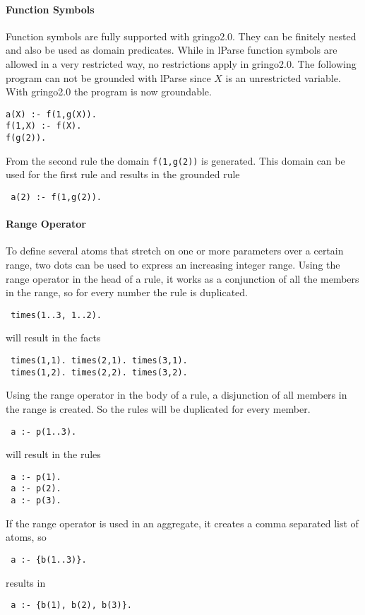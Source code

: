 \documentclass[a4paper,10pt]{article}
\begin{document}
\paragraph{Function Symbols}
Function symbols are fully supported with gringo2.0.
They can be finitely nested and also be used as domain predicates.
While in lParse function symbols are allowed in a very restricted way, no restrictions apply in gringo2.0.
The following program can not be grounded with lParse since $X$ is an unrestricted variable. With gringo2.0 the program is now groundable.
\begin{verbatim}
a(X) :- f(1,g(X)).
f(1,X) :- f(X).
f(g(2)).
\end{verbatim}
From the second rule the domain \texttt{f(1,g(2))} is generated.
This domain can be used for the first rule and results in the grounded rule
\begin{verbatim}
 a(2) :- f(1,g(2)).
\end{verbatim}

\paragraph{Range Operator}
To define several atoms that stretch on one or more parameters over a certain range, two dots can be used to express an increasing integer range.
Using the range operator in the head of a rule, it works as a conjunction of all the members in the range, so for every number the rule is duplicated.
\begin{verbatim}
 times(1..3, 1..2).
\end{verbatim}
will result in the facts
\begin{verbatim}
 times(1,1). times(2,1). times(3,1).
 times(1,2). times(2,2). times(3,2).
\end{verbatim}

Using the range operator in the body of a rule, a disjunction of all members in the range is created. So the rules will be duplicated for every member.
\begin{verbatim}
 a :- p(1..3).
\end{verbatim}
will result in the rules
\begin{verbatim}
 a :- p(1).
 a :- p(2).
 a :- p(3).
\end{verbatim}
If the range operator is used in an aggregate, it creates a comma separated list of atoms, so
\begin{verbatim}
 a :- {b(1..3)}.
\end{verbatim}
results in
\begin{verbatim}
 a :- {b(1), b(2), b(3)}.
\end{verbatim}
\end{document}
